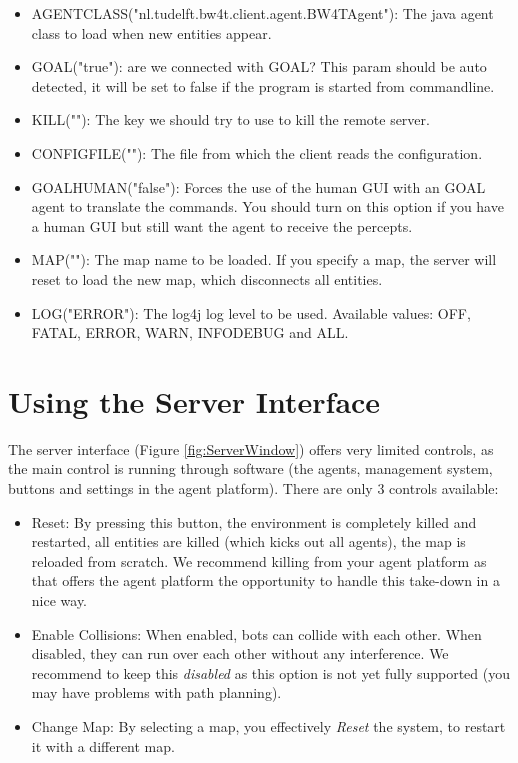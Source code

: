 \documentclass[11pt,a4paper]{article}
\begin{document}
\begin{itemize}
\item
    AGENTCLASS("nl.tudelft.bw4t.client.agent.BW4TAgent"):
    The java agent class to load when new entities appear.
   

\item
    GOAL("true"):
    are we connected with GOAL? This param should be auto detected, it will be set to false if the program is started from commandline.

\item
    KILL(""):
  The key we should try to use to kill the remote server.
 
\item
    CONFIGFILE(""):
    The file from which the client reads the configuration.
 
\item
    GOALHUMAN("false"):
    Forces the use of the human GUI with an GOAL agent to translate the commands. You should turn on this option if you have a human GUI but still want the agent to receive the percepts.

\item
    MAP(""):
    The map name to be loaded. If you specify a map, the server will reset to load the new map, which disconnects all entities.
     
\item    
    LOG("ERROR"):
    The log4j log level to be used. Available values: OFF, FATAL, ERROR, WARN, INFODEBUG and ALL.

\end{itemize}


\section{Using the Server Interface}
The server interface (Figure \ref{fig:ServerWindow}) offers very limited controls, as the main control is running through software (the agents, management system, buttons and settings in the agent platform). There are only 3 controls available:
\begin{itemize}
\item{Reset}: By pressing this button, the environment is completely killed and restarted, all entities are killed (which kicks out all agents), the map is reloaded from scratch. We recommend killing from your agent platform as that offers the agent platform the opportunity to handle this take-down in a nice way.
\item{Enable Collisions}: When enabled, bots can collide with each other. When disabled, they can run over each other without any interference. We recommend to keep this \emph{disabled} as this option is not yet fully supported (you may have problems with path planning).
\item{Change Map}: By selecting a map, you effectively \emph{Reset} the system, to restart it with a different map.
\end{itemize}
\end{document}
